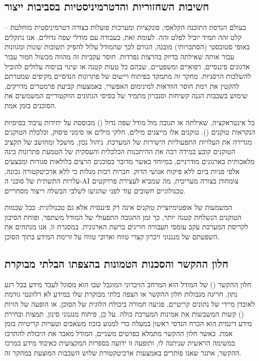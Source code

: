 \documentclass{hebrew-academic-template}
\begin{document}
\subsection{חשיבות השחזוריות והדטרמיניסטיות בסביבות ייצור}
בעולם הנדסת התוכנה הקלאסי, פונקציות ומערכות פועלות בצורה דטרמיניסטית מוחלטת – קלט זהה תמיד יוביל לפלט זהה. לעומת זאת, בעבודה עם מודלי שפה גדולים, אנו נתקלים באופי סטוכסטי (הסתברותי) מובנה, הגורם לכך שהמודל עלול להפיק תשובות שונות ומגוונות עבור אותה שאילתה בדיוק בהרצות נפרדות. חוסר עקביות זה מהווה מכשול חמור עבור ארגונים פיננסיים, רפואיים ומשפטיים, שבהם כל טעות קטנה או שינוי בניסוח עלולים להוביל להשלכות הרסניות. מחקר זה מתמקד בפיתוח ויישום של פתרונות הנדסיים מקיפים שמטרתם להקטין את רמת חוסר הוודאות למינימום האפשרי, באמצעות קביעת פרמטרים מדויקים, שימוש בשכבות הגנה קשיחות וסנכרון מתמיד של בסיסי הנתונים הווקטוריים המשמשים את הסוכנים בזמן אמת.

כל אינטראקציה, שאילתה או תגובה מול מודל שפה גדול () מבוססת על יחידות עיבוד בסיסיות הנקראות טוקנים (). טוקנים אלו מייצגים מילים, חלקי מילים או סימני פיסוק, וכלכלת הטוקנים מגדירה את העלויות התפעוליות הישירות של המערכת. ניהול נכון, מושכל ומחושב של תקציב הטוקנים קובע במידה רבה את ההיתכנות הכלכלית והעסקית של הטמעת פתרונות בינה מלאכותית בארגונים מודרניים, במיוחד כאשר מדובר בסוכנים הרצים בלולאות סגורות ומבצעים אלפי פניות ביום ללא פיקוח אנושי הדוק. חברות רבות מגלות כי ללא ארכיטקטורה נכונה, עלויות התשתית של סוכני ה-AI צומחות בצורה מעריכית, מה שמביא לעצירת פרויקטים טכנולוגיים חשובים עוד לפני שהגיעו לשלבי הבשלה וייצור מסחריים.

המשמעות של אופטימיזציית טוקנים אינה רק פיננסית אלא גם טכנולוגית: ככל שכמות הטוקנים הנשלחת קטנה יותר, כך זמן התגובה התפעולי של המודל משתפר, ופוחת הסיכון לקריסת המערכת עקב עומסי תעבורה חריגים ברשת הארגונית. במסגרת זו, אנו מנתחים את השפעתם של מנגנוני זיכרון קצרי טווח וארוכי טווח על זרימת המידע בתוך הסוכן.

\subsection{חלון ההקשר והסכנות הטמונות בהצפתו הבלתי מבוקרת}
חלון ההקשר () של המודל הוא המרחב הזיכרוני המוגבל שבו הוא מסוגל לעבד מידע בכל רגע נתון. חריגה מגבולות חלון ההקשר או הצפה בלתי מבוקרת שלו במידע לא רלוונטי גורמת לאובדן מיידי של נתונים קריטיים, פגיעה חמורה ביכולת הלוגית של הסוכן, או הופעה של הזיות () קשות המשבשות את אמינות המערכת כולה. על כן, פיתוח מנגנוני סינון, תמצות ובחירת מידע דינמית הוא הכרח הנדסי ראשון במעלה כדי למנוע בזבוז משאבים וטעויות קריטיות בזמן אמת. כאשר חלון ההקשר מתמלא בפרטים משניים, המודל מאבד את היכולת להתרכז במשימה הראשית שניתנה לו, ותופעה זו ידועה בספרות המקצועית כאיבוד מידע במרכז ההקשר, אתגר שאנו פותרים באמצעות ארכיטקטורת שלוש השכבות המוצעת במחקר זה.
\end{document}
